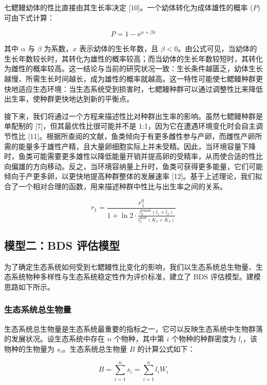 \documentclass[11pt,a4paper]{ctexart}
\begin{document}
七鳃鳗幼体的性比直接由其生长率决定 [10]。一个幼体转化为成体雄性的概率 ($P$) 可由下式计算：

\begin{equation}
P=1-\mathrm{e}^{\alpha+\beta x}
\end{equation}

其中 $\alpha$ 与 $\beta$ 为系数，$x$ 表示幼体的生长年数，且 $\beta<0$。由公式可见，当幼体的生长年数较长时，其转化为雄性的概率较高；而当幼体的生长年数较短时，其转化为雌性的概率较高。这一结论与当前的研究状况一致：生长条件越匮乏，幼体生长越慢、所需生长时间越长，成为雄性的概率就越高。这一特性可能使七鳃鳗种群更快地适应生态环境：当生态系统受到损害时，七鳃鳗种群可以通过调整性比来降低出生率，使种群更快地达到新的平衡点。

接下来，我们将通过一个方程来描述性比对种群出生率的影响。虽然七鳃鳗种群是单配制的 [7]，但其最优性比很可能并不是 1:1，因为它在遭遇环境变化时会自主调节性比 [11]。根据所查阅的文献，鱼类倾向于有更多雌性参与产卵，而雌性产卵所需的能量多于雄性产精，且大量卵细胞实际上并未受精。因此，当环境容量下降时，鱼类可能需要更多雄性以降低能量开销并提高卵的受精率，从而使合适的性比向偏雄的方向移动。反之，当环境容纳量上升时，鱼类可获得更多能量，它们可能倾向于产更多卵，以更快地提高种群整体的发展速率 [12]。基于上述理论，我们拟合了一个相对合理的函数，用来描述种群中性比与出生率之间的关系。

\begin{equation}
r_1=\frac{r_1^{0}}{1+\ln 2\cdot\frac{l_2^{\mathrm{female}}\left(l_1+l_2\right)}{l_2^{\mathrm{male}}\left(K_1+K_2\right)}}
\end{equation}

\subsection{模型二：BDS 评估模型}

为了确定生态系统如何受到七鳃鳗性比变化的影响，我们以生态系统总生物量、生态系统物种多样性与生态系统稳定性作为评价标准，建立了 BDS 评估模型。建模思路如下所示。

\subsubsection{生态系统总生物量}

生态系统总生物量是生态系统最重要的指标之一，它可以反映生态系统中生物群落的发展状况。设生态系统中存在 $n$ 个物种，其中第 $i$ 个物种的种群密度为 $l_i$，该物种的生物量为 $s_i$。生态系统总生物量 $B$ 的计算公式如下：

\begin{equation}
B=\sum_{i=1}^{n}s_i=\sum_{i=1}^{n}l_i W_i
\end{equation}
\end{document}
